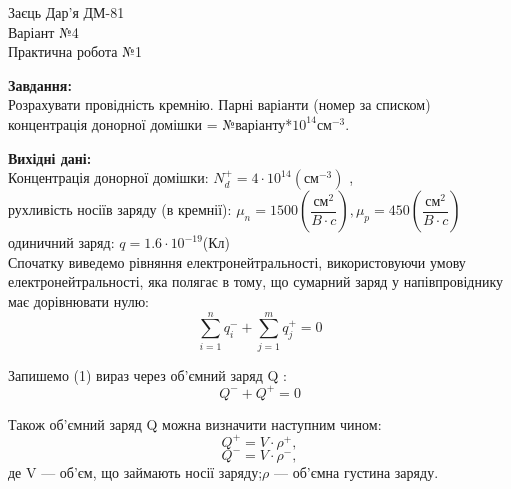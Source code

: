 \documentclass[a4paper,12pt]{article}
\begin{document}
\pagecolor{white}
\begin{center}
\begin{Large}
Заєць Дар'я ДМ-81\\
Варіант №4\\

\vspace{0.2cm}
Практична робота №1\\
\end{Large}
\end{center}

\large
\vspace{0.3cm}



\textbf{Завдання:}\\

Розрахувати провідність кремнію. Парні варіанти (номер за списком) концентрація донорної домішки = №варіанту*$10^{14} \text{см}^{-3}$.\\
\vspace{0.3cm}

\textbf{Вихідні дані:}\\

Концентрація донорної домішки: $N^+_d =4\cdot10^{14} (\text{см$^{-3}$})$ ,\\

рухливість носіїв заряду (в кремнії): $\mu_n = 1500\left(\dfrac{\text{см$^2$}}{B\cdot c}\right), \mu_p = 450 \left(\dfrac{\text{см$^2$}}{B\cdot c}\right)$\\

одиничний заряд: $q = 1.6\cdot 10^{-19}$(Кл)\\

Спочатку виведемо рівняння  електронейтральності, використовуючи умову електронейтральності, яка полягає в тому, що сумарний заряд у напівпровіднику має дорівнювати нулю:
\begin{equation}
\sum\limits_{i=1}^n q^-_{i}+ \sum\limits_{j=1}^m q^+_{j} = 0
\label{eq:ref}
\end{equation}

Запишемо (1) вираз через об’ємний заряд Q :
\begin{equation}
Q^-+ Q^+ = 0
\label{eq:ref}
\end{equation}

Також об’ємний заряд Q можна визначити наступним чином:
\begin{equation}
Q^+ = V\cdot \rho^+,
\end{equation}
\begin{equation}
Q^- = V\cdot \rho^-,
\end{equation}
де V --- об’єм, що займають носії заряду;$\rho$ --- об’ємна густина заряду.\\
\end{document}
